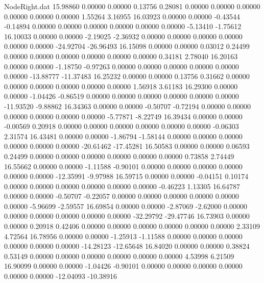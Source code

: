 \begin{filecontents}{NodeRight.dat}
  15.98860    0.00000    0.00000     0.13756    0.28081    0.00000    0.00000    0.00000    0.00000    0.00000    0.00000    1.55264    3.16955
  16.03923    0.00000    0.00000    -0.43544   -0.14894    0.00000    0.00000    0.00000    0.00000    0.00000    0.00000   -5.13410   -1.75612
  16.10033    0.00000    0.00000    -2.19025   -2.36932    0.00000    0.00000    0.00000    0.00000    0.00000    0.00000  -24.92704  -26.96493
  16.15098    0.00000    0.00000     0.03012    0.24499    0.00000    0.00000    0.00000    0.00000    0.00000    0.00000    0.34181    2.78040
  16.20163    0.00000    0.00000    -1.18750   -0.97263    0.00000    0.00000    0.00000    0.00000    0.00000    0.00000  -13.88777  -11.37483
  16.25232    0.00000    0.00000     0.13756    0.31662    0.00000    0.00000    0.00000    0.00000    0.00000    0.00000    1.56918    3.61183
  16.29300    0.00000    0.00000    -1.04426   -0.86519    0.00000    0.00000    0.00000    0.00000    0.00000    0.00000  -11.93520   -9.88862
  16.34363    0.00000    0.00000    -0.50707   -0.72194    0.00000    0.00000    0.00000    0.00000    0.00000    0.00000   -5.77871   -8.22749
  16.39434    0.00000    0.00000    -0.00569    0.20918    0.00000    0.00000    0.00000    0.00000    0.00000    0.00000   -0.06303    2.31574
  16.43481    0.00000    0.00000    -1.86794   -1.58144    0.00000    0.00000    0.00000    0.00000    0.00000    0.00000  -20.61462  -17.45281
  16.50583    0.00000    0.00000     0.06593    0.24499    0.00000    0.00000    0.00000    0.00000    0.00000    0.00000    0.73858    2.74449
  16.55662    0.00000    0.00000    -1.11588   -0.90101    0.00000    0.00000    0.00000    0.00000    0.00000    0.00000  -12.35991   -9.97988
  16.59715    0.00000    0.00000    -0.04151    0.10174    0.00000    0.00000    0.00000    0.00000    0.00000    0.00000   -0.46223    1.13305
  16.64787    0.00000    0.00000    -0.50707   -0.22057    0.00000    0.00000    0.00000    0.00000    0.00000    0.00000   -5.96699   -2.59557
  16.69854    0.00000    0.00000    -2.87069   -2.62000    0.00000    0.00000    0.00000    0.00000    0.00000    0.00000  -32.29792  -29.47746
  16.73903    0.00000    0.00000     0.20918    0.42406    0.00000    0.00000    0.00000    0.00000    0.00000    0.00000    2.33109    4.72564
  16.78956    0.00000    0.00000    -1.25913   -1.11588    0.00000    0.00000    0.00000    0.00000    0.00000    0.00000  -14.28123  -12.65648
  16.84020    0.00000    0.00000     0.38824    0.53149    0.00000    0.00000    0.00000    0.00000    0.00000    0.00000    4.53998    6.21509
  16.90099    0.00000    0.00000    -1.04426   -0.90101    0.00000    0.00000    0.00000    0.00000    0.00000    0.00000  -12.04093  -10.38916

\end{filecontents}
